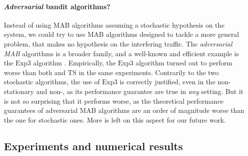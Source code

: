 \paragraph{\emph{Adversarial} bandit algorithms?}

Instead of using MAB algorithms assuming a stochastic hypothesis on the system, we could try to use MAB algorithms designed to tackle a more general problem, that makes no hypothesis on the interfering traffic.
The \emph{adversarial MAB} algorithms is a broader family, and a well-known and efficient example is the $\mathrm{Exp}3$ algorithm \cite{Bubeck12}.
Empirically, the $\mathrm{Exp}3$ algorithm turned out to perform worse than both \UCB{} and TS in the same experiments.
Contrarily to the two stochastic algorithms, the use of $\mathrm{Exp}3$ is correctly justified, even in the non-stationary and non-\iid, as its performance guarantee are true in \emph{any} setting.
But it is not so surprising that it performs worse, as the theoretical performance guarantees of adversarial MAB algorithms are an order of magnitude
worse than the one for stochastic ones.
More is left on this aspect for our future work.



\subsection{Experiments and numerical results}\label{sub:41:numericalResults}

